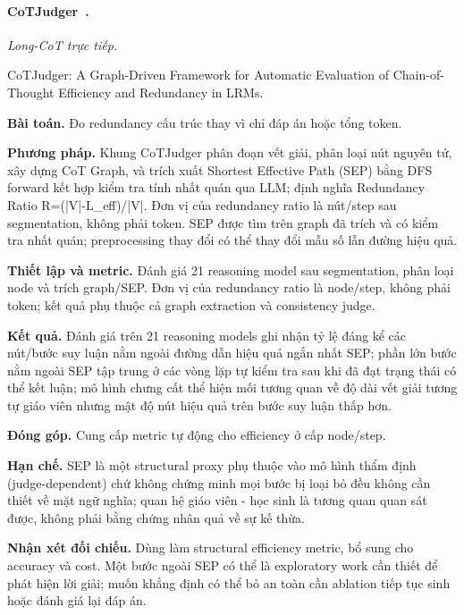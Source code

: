 \begin{samepage}
\paragraph{CoTJudger~\cite{rra4_cotjudger}.}
\emph{Long-CoT trực tiếp.}\par
{\raggedright\noindent\small CoTJudger: A Graph-Driven Framework for Automatic Evaluation of Chain-of-Thought Efficiency and Redundancy in LRMs.\par}
\noindent\textbf{Bài toán.} Đo redundancy cấu trúc thay vì chỉ đáp án hoặc tổng token.\par
\end{samepage}
\noindent\textbf{Phương pháp.} Khung CoTJudger phân đoạn vết giải, phân loại nút nguyên tử, xây dựng CoT Graph, và trích xuất Shortest Effective Path (SEP) bằng DFS forward kết hợp kiểm tra tính nhất quán qua LLM; định nghĩa Redundancy Ratio R=(|V|-L\_eff)/|V|. Đơn vị của redundancy ratio là nút/step sau segmentation, không phải token. SEP được tìm trên graph đã trích và có kiểm tra nhất quán; preprocessing thay đổi có thể thay đổi mẫu số lẫn đường hiệu quả.\par
\noindent\textbf{Thiết lập và metric.} Đánh giá 21 reasoning model sau segmentation, phân loại node và trích graph/SEP. Đơn vị của redundancy ratio là node/step, không phải token; kết quả phụ thuộc cả graph extraction và consistency judge.\par
\noindent\textbf{Kết quả.} Đánh giá trên 21 reasoning models ghi nhận tỷ lệ đáng kể các nút/bước suy luận nằm ngoài đường dẫn hiệu quả ngắn nhất SEP; phần lớn bước nằm ngoài SEP tập trung ở các vòng lặp tự kiểm tra sau khi đã đạt trạng thái có thể kết luận; mô hình chưng cất thể hiện mối tương quan về độ dài vết giải tương tự giáo viên nhưng mật độ nút hiệu quả trên bước suy luận thấp hơn.\par
\noindent\textbf{Đóng góp.} Cung cấp metric tự động cho efficiency ở cấp node/step.\par
\noindent\textbf{Hạn chế.} SEP là một structural proxy phụ thuộc vào mô hình thẩm định (judge-dependent) chứ không chứng minh mọi bước bị loại bỏ đều không cần thiết về mặt ngữ nghĩa; quan hệ giáo viên - học sinh là tương quan quan sát được, không phải bằng chứng nhân quả về sự kế thừa.\par
\begin{samepage}
\noindent\textbf{Nhận xét đối chiếu.} Dùng làm structural efficiency metric, bổ sung cho accuracy và cost. Một bước ngoài SEP có thể là exploratory work cần thiết để phát hiện lời giải; muốn khẳng định có thể bỏ an toàn cần ablation tiếp tục sinh hoặc đánh giá lại đáp án.\par
{}
\end{samepage}

